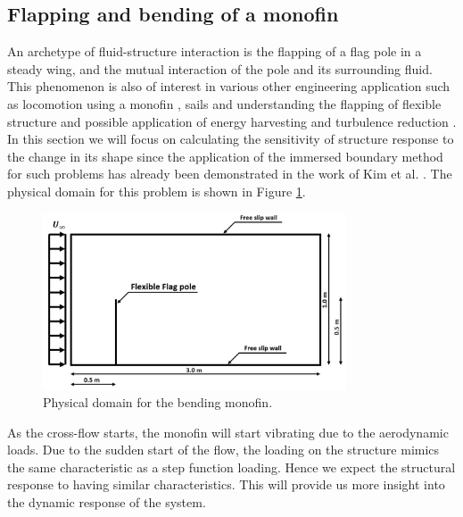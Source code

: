 \subsection{Flapping and bending of a monofin}
An archetype of fluid-structure interaction is the flapping of a flag pole in a steady wing, and the mutual interaction of the pole and its surrounding fluid. This phenomenon is also of interest in various other engineering application such as locomotion using a monofin \cite{luersen2006computationally}, sails and understanding the flapping of flexible structure and possible application of energy harvesting \cite{allen2001energy} and turbulence reduction \cite{shen2003turbulent}. In this section we will focus on calculating the sensitivity of structure response to the change in its shape since the application of the immersed boundary method for such problems has already been demonstrated in the work of Kim et al. \cite{kim2007penalty}. The physical domain for this problem is shown in Figure \ref{fig:C5_flagPolePhysical}.
%
\begin{figure}[H]
    \centering
    \includegraphics[width=9.00cm]{Chapter_5/figure/flagPole_domain_shape.jpg}
    \caption{Physical domain for the bending monofin.}
    \label{fig:C5_flagPolePhysical}
\end{figure}
%
As the cross-flow starts, the monofin will start vibrating due to the aerodynamic loads. Due to the sudden start of the flow, the loading on the structure mimics the same characteristic as a step function loading. Hence we expect the structural response to having similar characteristics. This will provide us more insight into the dynamic response of the system. 

